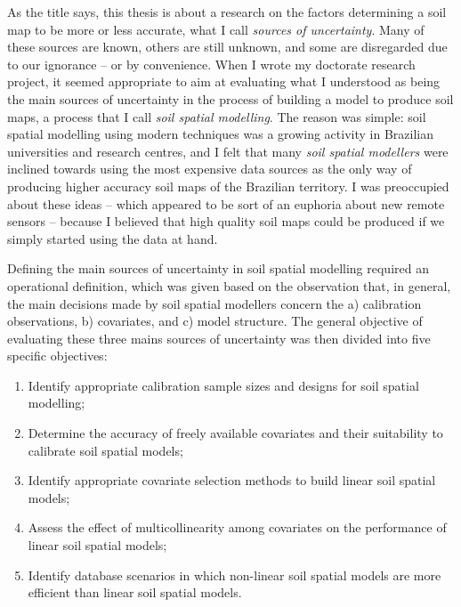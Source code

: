 As the title says, this thesis is about a research on the factors determining a soil map to be more or less 
accurate, what I call \emph{sources of uncertainty}. Many of these sources are known, others are still unknown, 
and some are disregarded due to our ignorance -- or by convenience. When I wrote my doctorate research project, 
it seemed appropriate to aim at evaluating what I understood as being the main sources of uncertainty in the 
process of building a model to produce soil maps, a process that I call \emph{soil spatial modelling}. The 
reason was simple: soil spatial modelling using modern techniques was a growing activity in Brazilian 
universities and research centres, and I felt that many \emph{soil spatial modellers} were inclined towards 
using the most expensive data sources as the only way of producing higher accuracy soil maps of the Brazilian 
territory. I was preoccupied about these ideas -- which appeared to be sort of an euphoria about new remote 
sensors -- because I believed that high quality soil maps could be produced if we simply started using the data 
at hand.

Defining the main sources of uncertainty in soil spatial modelling required an operational definition, which 
was given based on the observation that, in general, the main decisions made by soil spatial modellers concern 
the a) calibration observations, b) covariates, and c) model structure. The general objective of evaluating 
these three mains sources of uncertainty was then divided into five specific objectives:

\clearpage

\begin{enumerate}[label=(\Roman*)]
\item Identify appropriate calibration sample sizes and designs for soil spatial modelling;

\item Determine the accuracy of freely available covariates and their suitability to calibrate soil spatial 
models;

\item Identify appropriate covariate selection methods to build linear soil spatial models;

\item Assess the effect of multicollinearity among covariates on the performance of linear soil spatial models;

\item Identify database scenarios in which non-linear soil spatial models are more efficient than linear soil 
spatial models.
\end{enumerate}

